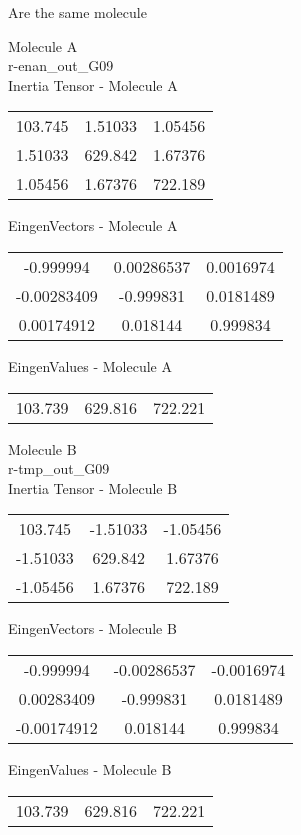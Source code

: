\begin{center}
\vtab
\vtab
\textcolor{NavyBlue}{\Large Are the same molecule}
\end{center}
\newpage
\begin{multicols}{2}
\begin{center}
Molecule A \\ 
r-enan\_out\_G09
\\
Inertia Tensor - Molecule A \\
\vtab
\begin{tabular}{|c c c|}
103.745	 & 	1.51033	 & 	1.05456	 \\
1.51033	 & 	629.842	 & 	1.67376	 \\
1.05456	 & 	1.67376	 & 	722.189
\end{tabular}

\vtab
 EingenVectors - Molecule A     \\
\vtab
\begin{tabular}{|c c c|}
-0.999994	 & 	0.00286537	 & 	0.0016974	 \\
-0.00283409	 & 	-0.999831	 & 	0.0181489	 \\
0.00174912	 & 	0.018144	 & 	0.999834
\end{tabular}

\vtab
 EingenValues - Molecule A     \\
\vtab
\begin{tabular}{|c c c|}
103.739	 & 	629.816	 & 	722.221
\end{tabular}
\columnbreak

Molecule B \\ 
r-tmp\_out\_G09
\\
Inertia Tensor - Molecule B \\
\vtab
\begin{tabular}{|c c c|}
103.745	 & 	-1.51033	 & 	-1.05456	 \\
-1.51033	 & 	629.842	 & 	1.67376	 \\
-1.05456	 & 	1.67376	 & 	722.189
\end{tabular}

\vtab
 EingenVectors - Molecule B     \\
\vtab
\begin{tabular}{|c c c|}
-0.999994	 & 	-0.00286537	 & 	-0.0016974	 \\
0.00283409	 & 	-0.999831	 & 	0.0181489	 \\
-0.00174912	 & 	0.018144	 & 	0.999834
\end{tabular}

\vtab
 EingenValues - Molecule B     \\
\vtab
\begin{tabular}{|c c c|}
103.739	 & 	629.816	 & 	722.221
\end{tabular}

\end{center}
\end{multicols}
